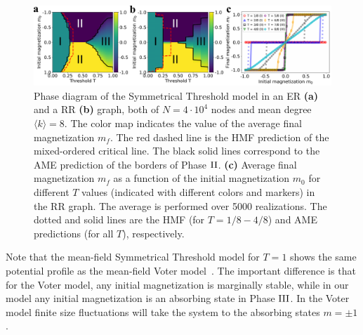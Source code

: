 \begin{figure}
	\centering \captionsetup{font=sf}
	\includegraphics[width=\linewidth]{Figs/Aging_STM/FIG2.pdf}
	\caption[Phase diagram in random networks]{\label{ER_REG_PD} Phase diagram of the Symmetrical Threshold model in an ER \textbf{(a)} and a RR \textbf{(b)} graph, both of $N=4\cdot10^4$ nodes and mean degree $\langle k \rangle=8$. The color map indicates the value of the average final magnetization $m_f$. The red dashed line is the HMF prediction of the mixed-ordered critical line. The black solid lines correspond to the AME prediction of the borders of Phase ${\rm II}$. \textbf{(c)} Average final magnetization $m_f$ as a function of the initial magnetization $m_0$ for different $T$ values (indicated with different colors and markers) in the RR graph. The average is performed over 5000 realizations. The dotted and solid lines are the HMF (for $T=1/8 - 4/8$) and AME predictions (for all $T$), respectively.}
\end{figure}

\pagebreak
Note that the mean-field Symmetrical Threshold model for $T=1$ shows the same potential profile as the mean-field Voter model~\cite{Suchecki-2005, Voter-original,castellano2009statistical}. The important difference is that for the Voter model, any initial magnetization is marginally stable, while in our model any initial magnetization is an absorbing state in Phase ${\rm III}$. In the Voter model finite size fluctuations will take the system to the absorbing states $m=\pm 1$. 


